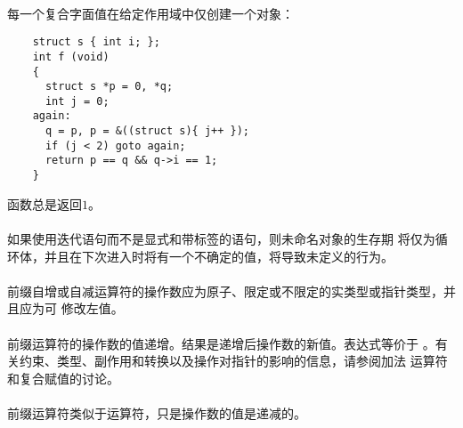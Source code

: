 \paragraph{}
\ex 每一个复合字面值在给定作用域中仅创建一个对象：
\begin{lstlisting}
    struct s { int i; };
    int f (void)
    {
      struct s *p = 0, *q;
      int j = 0;
    again:
      q = p, p = &((struct s){ j++ });
      if (j < 2) goto again;
      return p == q && q->i == 1;
    }
\end{lstlisting}
函数总是返回$1$。

\paragraph{}
\notes* 如果使用迭代语句而不是显式和带标签的语句，则未命名对象的生存期
将仅为循环体，并且在下次进入时将有一个不确定的值，将导致未定义的行为。


\syntax
\paragraph{}
  \synprd[]{\tm{\&\ \ *\ \ +\ \ -\ \ \~\ \ !}}

\constraint
\paragraph{}
前缀自增或自减运算符的操作数应为原子、限定或不限定的实类型或指针类型，并且应为可
修改左值。

\semantic
\paragraph{}
前缀\tm{++}运算符的操作数的值递增。结果是递增后操作数的新值。表达式等价于
。有关约束、类型、副作用和转换以及操作对指针的影响的信息，请参阅加法
运算符和复合赋值的讨论。

\paragraph{}
前缀\tm{-\dsh}运算符类似于\tm{++}运算符，只是操作数的值是递减的。

